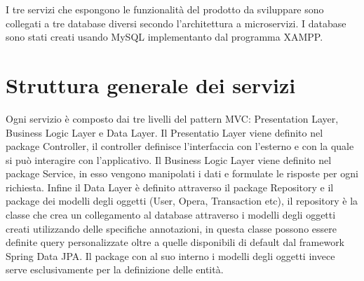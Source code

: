 I tre servizi che espongono le funzionalità del prodotto da sviluppare sono collegati a tre database diversi secondo l'architettura a microservizi. I database sono stati creati usando MySQL implementanto dal programma XAMPP. 
\section{Struttura generale dei servizi}
Ogni servizio è composto dai tre livelli del pattern MVC: Presentation Layer, Business Logic Layer e Data Layer. Il Presentatio Layer viene definito nel package Controller, il controller definisce l'interfaccia con l'esterno e con la quale si può interagire con l'applicativo. Il Business Logic Layer viene definito nel package Service, in esso vengono manipolati i dati e formulate le risposte per ogni richiesta. Infine il Data Layer è definito attraverso il package Repository e il package dei modelli degli oggetti (User, Opera, Transaction etc), il repository è la classe che crea un collegamento al database attraverso i modelli degli oggetti creati utilizzando delle specifiche annotazioni, in questa classe possono essere definite query personalizzate oltre a quelle disponibili di default dal framework Spring Data JPA. Il package con al suo interno i modelli degli oggetti invece serve esclusivamente per la definizione delle entità.
